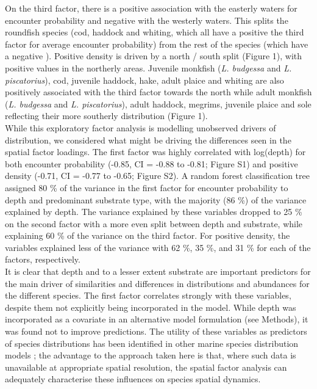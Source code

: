 \documentclass[fleqn,10pt]{wlscirep}
\begin{document}
\begin{linenumbers}
On the third factor, there is a positive association with the easterly waters
for encounter probability and negative with the westerly waters. This splits
the roundfish species (cod, haddock and whiting, which all have a positive
 the third factor for
average encounter probability) from the rest of the species (which have a
negative ). Positive density is
driven by a north / south split (Figure 1), with positive
 values in the northerly areas. Juvenile monkfish
(\emph{L.  budgessa} and \emph{L.  piscatorius}), cod, juvenile haddock, hake,
adult plaice and whiting are also positively associated with the third factor
towards the north while adult monkfish (\emph{L. budgessa} and \emph{L.
	piscatorius}), adult haddock, megrims, juvenile plaice and sole
reflecting their more southerly distribution (Figure 1).\\

While this exploratory factor analysis is modelling unobserved drivers of
distribution, we considered what might be driving the differences seen in the
spatial factor loadings. The first factor was highly correlated with log(depth)
for both  encounter probability (-0.85, CI = -0.88 to
-0.81; Figure S1) and  positive density (-0.71, CI =
-0.77 to -0.65; Figure S2). A random forest classification tree assigned 80 \%
of the variance in the first factor for  encounter
probability to depth and predominant substrate type, with the majority (86 \%)
of the variance explained by depth. The variance explained by these variables
dropped to 25 \% on the second factor with a more even split between depth and
substrate, while explaining 60 \% of the variance on the third factor.  For
 positive density, the variables explained less of the
variance with 62 \%, 35 \%, and 31 \% for each of the factors, respectively.\\

It is clear that depth and to a lesser extent substrate are important
predictors for the main driver of similarities and differences in distributions
and abundances for the different species. The first factor correlates
strongly with these variables, despite them not explicitly being incorporated
in the model. While depth was incorporated as a covariate in an alternative
model formulation (see Methods), it was found not to improve predictions. The
utility of these variables as predictors of species distributions has been
identified in other marine species distribution models \cite{Robinson2011}; the
advantage to the approach taken here is that, where such data is unavailable at
appropriate spatial resolution, the spatial factor analysis can adequately
characterise these influences on species spatial dynamics.\\


\end{linenumbers}
\end{document}
